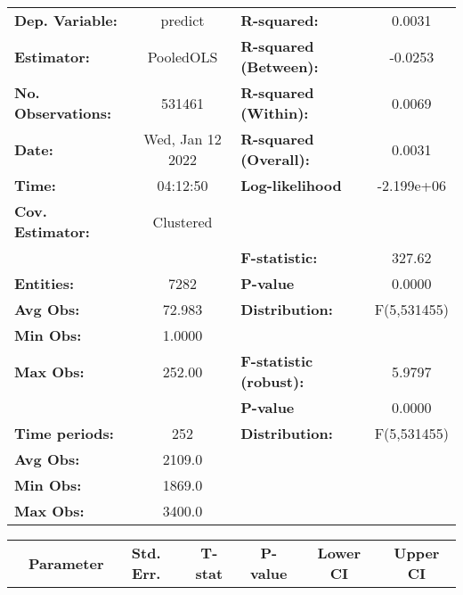 \begin{center}
\begin{tabular}{lclc}
\toprule
\textbf{Dep. Variable:}    &      predict       & \textbf{  R-squared:         }   &      0.0031      \\
\textbf{Estimator:}        &     PooledOLS      & \textbf{  R-squared (Between):}  &     -0.0253      \\
\textbf{No. Observations:} &       531461       & \textbf{  R-squared (Within):}   &      0.0069      \\
\textbf{Date:}             &  Wed, Jan 12 2022  & \textbf{  R-squared (Overall):}  &      0.0031      \\
\textbf{Time:}             &      04:12:50      & \textbf{  Log-likelihood     }   &    -2.199e+06    \\
\textbf{Cov. Estimator:}   &     Clustered      & \textbf{                     }   &                  \\
\textbf{}                  &                    & \textbf{  F-statistic:       }   &      327.62      \\
\textbf{Entities:}         &        7282        & \textbf{  P-value            }   &      0.0000      \\
\textbf{Avg Obs:}          &       72.983       & \textbf{  Distribution:      }   &   F(5,531455)    \\
\textbf{Min Obs:}          &       1.0000       & \textbf{                     }   &                  \\
\textbf{Max Obs:}          &       252.00       & \textbf{  F-statistic (robust):} &      5.9797      \\
\textbf{}                  &                    & \textbf{  P-value            }   &      0.0000      \\
\textbf{Time periods:}     &        252         & \textbf{  Distribution:      }   &   F(5,531455)    \\
\textbf{Avg Obs:}          &       2109.0       & \textbf{                     }   &                  \\
\textbf{Min Obs:}          &       1869.0       & \textbf{                     }   &                  \\
\textbf{Max Obs:}          &       3400.0       & \textbf{                     }   &                  \\
\bottomrule
\end{tabular}
\begin{tabular}{lcccccc}
                & \textbf{Parameter} & \textbf{Std. Err.} & \textbf{T-stat} & \textbf{P-value} & \textbf{Lower CI} & \textbf{Upper CI}  \\

\end{tabular}
\end{center}
